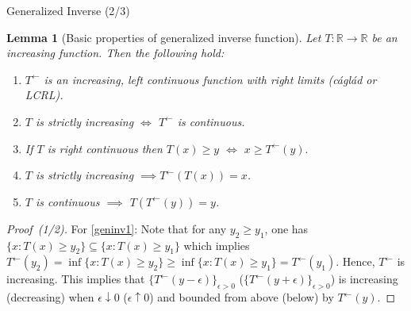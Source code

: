 \documentclass[envcountsect]{beamer}
\newcommand{\bR}{\mathbb{R}}
\theoremstyle{definition}
\theoremstyle{plain}
\newtheorem{lem}[df]{Lemma}
\newcommand*{\geninv}[1]{#1^{\leftarrow}}
\begin{document}
\begin{frame}{Generalized Inverse (2/3)}
\begin{lem}[Basic properties of generalized inverse function] \label{geninv-lem}
	Let $T:\bR \rightarrow \bR$ be an increasing function. Then the following hold:
	\begin{enumerate}
		\item \label{geninv1} $\geninv{T}$ is an increasing, left continuous function with right limits (c\'agl\'ad or LCRL).
		\item \label{geninv2}$T$ is strictly increasing $\iff$ $\geninv{T}$ is continuous.
		\item  \label{geninv5} If $T$ is right continuous then $T(x) \ge y$ $\iff$ $x \ge \geninv{T}(y).$
		\item \label{geninv3} $T$ is strictly increasing  $\implies \geninv{T}(T(x)) = x$.
		\item \label{geninv4} $T$ is continuous $\implies$ $T(\geninv{T}(y)) = y$.
	\end{enumerate}
\end{lem}
\begin{proof}[Proof~(1/2)]
	For \ref{geninv1}: Note that for any $y_2 \ge y_1$, one has $\{x: T(x)\ge y_2\} \subseteq \{x: T(x)\ge y_1\}$ which implies $\geninv{T}(y_2)= \inf \{x: T(x)\ge y_2\}  \ge \inf \{x: T(x)\ge y_1\} = \geninv{T}(y_1)$. Hence, $\geninv{T}$ is increasing. This implies that $\{\geninv{T}(y-\epsilon)\}_{\epsilon>0}$ ($\{\geninv{T}(y+\epsilon)\}_{\epsilon>0}$) is increasing (decreasing) when $\epsilon \downarrow 0$ ($\epsilon \uparrow 0$) and bounded from above (below) by $\geninv{T}(y)$. 
\end{proof}
\end{frame}
\end{document}
